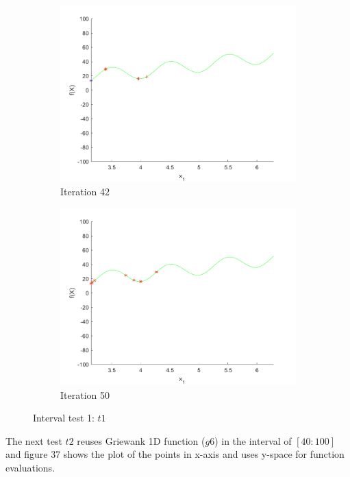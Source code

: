 \begin{figure}
\begin{subfigure}[b]{0.4\textwidth}
   \includegraphics[width=\textwidth]{img/smpl/rast1dshft/loa-iter-42}
   \caption{Iteration 42}
   \label{fig:i1-iter-6}
 \end{subfigure}
 \begin{subfigure}[b]{0.4\textwidth}
   \includegraphics[width=\textwidth]{img/smpl/rast1dshft/loa-iter-50}
   \caption{Iteration 50}
   \label{fig:i1-iter-7}
 \end{subfigure}
 \caption{Interval test 1: $t1$}
\end{figure}

\par The next test $t2$ reuses Griewank 1D function ($g6$) in the interval of $[40:100]$ and figure 37 shows the plot of the points in x-axis and uses y-space for function evaluations.

